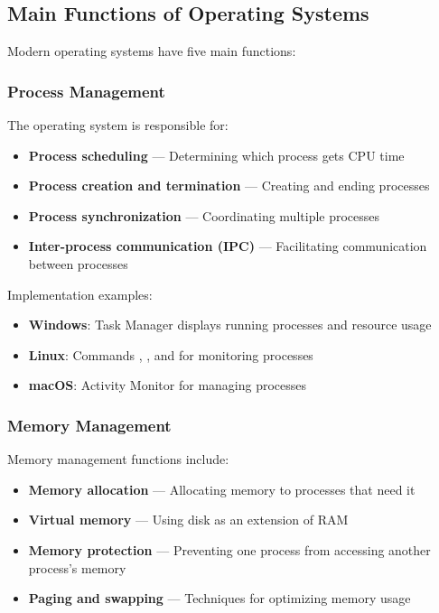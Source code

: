 \subsection{Main Functions of Operating Systems}

Modern operating systems have five main functions:

\subsubsection{Process Management}

The operating system is responsible for:
\begin{itemize}
    \item \textbf{Process scheduling} --- Determining which process gets CPU time
    \item \textbf{Process creation and termination} --- Creating and ending processes
    \item \textbf{Process synchronization} --- Coordinating multiple processes
    \item \textbf{Inter-process communication (IPC)} --- Facilitating communication between processes
\end{itemize}

Implementation examples:
\begin{itemize}
    \item \textbf{Windows}: Task Manager displays running processes and resource usage
    \item \textbf{Linux}: Commands , , and  for monitoring processes
    \item \textbf{macOS}: Activity Monitor for managing processes
\end{itemize}

\subsubsection{Memory Management}

Memory management functions include:
\begin{itemize}
    \item \textbf{Memory allocation} --- Allocating memory to processes that need it
    \item \textbf{Virtual memory} --- Using disk as an extension of RAM
    \item \textbf{Memory protection} --- Preventing one process from accessing another process's memory
    \item \textbf{Paging and swapping} --- Techniques for optimizing memory usage
\end{itemize}

